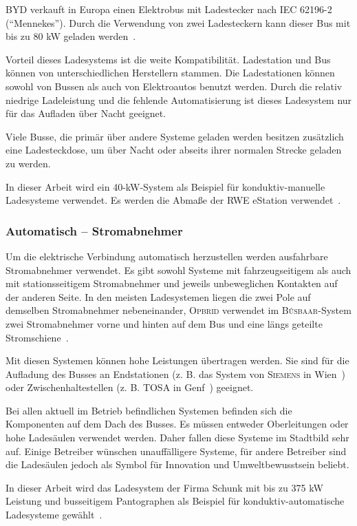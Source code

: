 \textsc{BYD} verkauft in Europa einen Elektrobus mit Ladestecker nach IEC 62196-2 ("`Mennekes"'). Durch die Verwendung von zwei Ladesteckern kann dieser Bus mit bis zu 80 kW geladen werden~\cite{bydSpecs4}.

Vorteil dieses Ladesystems ist die weite Kompatibilität. Ladestation und Bus können von unterschiedlichen Herstellern stammen. Die Ladestationen können sowohl von Bussen als auch von Elektroautos benutzt werden. Durch die relativ niedrige Ladeleistung und die fehlende Automatisierung ist dieses Ladesystem nur für das Aufladen über Nacht geeignet.

Viele Busse, die primär über andere Systeme geladen werden besitzen zusätzlich eine Ladesteckdose, um über Nacht oder abseits ihrer normalen Strecke geladen zu werden.

In dieser Arbeit wird ein 40-kW-System als Beispiel für konduktiv-manuelle Ladesysteme verwendet. Es werden die Abmaße der RWE eStation verwendet~\cite{rweKonMan}.

\subsubsection{Automatisch – Stromabnehmer}
Um die elektrische Verbindung automatisch herzustellen werden ausfahrbare Stromabnehmer verwendet. Es gibt sowohl Systeme mit fahrzeugseitigem als auch mit stationsseitigem Stromabnehmer und jeweils unbeweglichen Kontakten auf der anderen Seite. In den meisten Ladesystemen liegen die zwei Pole auf demselben Stromabnehmer nebeneinander, \textsc{Opbrid} verwendet im \textsc{Bůsbaar}-System zwei Stromabnehmer vorne und hinten auf dem Bus und eine längs geteilte Stromschiene~\cite{SchKonLade}.

Mit diesen Systemen können hohe Leistungen übertragen werden. Sie sind für die Aufladung des Busses an Endstationen (z. B. das System von \textsc{Siemens} in Wien~\cite{SiemensWien}) oder Zwischenhaltestellen (z. B. \textsc{TOSA} in Genf~\cite{tosa}) geeignet. 

Bei allen aktuell im Betrieb befindlichen Systemen befinden sich die Komponenten auf dem Dach des Busses. Es müssen entweder Oberleitungen oder hohe Ladesäulen verwendet werden. Daher fallen diese Systeme im Stadtbild sehr auf. Einige Betreiber wünschen unauffälligere Systeme, für andere Betreiber sind die Ladesäulen jedoch als Symbol für Innovation und Umweltbewusstsein beliebt.

In dieser Arbeit wird das Ladesystem der Firma Schunk mit bis zu 375 kW Leistung und busseitigem Pantographen als Beispiel für konduktiv-automatische Ladesysteme gewählt~\cite{Weigel:2013}.

